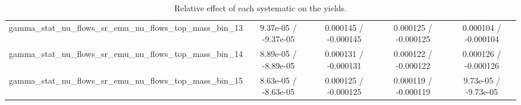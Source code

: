\documentclass[10pt]{article}
\begin{document}
\begin{table}[htbp]
\begin{center}
\begin{tabular}{|c|c|c|c|c|}
  gamma_stat_nu_flows_sr_emu_nu_flows_top_mass_bin_13 & 9.37e-05 / -9.37e-05 & 0.000145 / -0.000145 & 0.000125 / -0.000125 & 0.000104 / -0.000104 \\ 
  gamma_stat_nu_flows_sr_emu_nu_flows_top_mass_bin_14 & 8.89e-05 / -8.89e-05 & 0.000131 / -0.000131 & 0.000122 / -0.000122 & 0.000126 / -0.000126 \\ 
  gamma_stat_nu_flows_sr_emu_nu_flows_top_mass_bin_15 & 8.63e-05 / -8.63e-05 & 0.000125 / -0.000125 & 0.000119 / -0.000119 & 9.73e-05 / -9.73e-05 \\ 
\hline 
\end{tabular} 
\caption{Relative effect of each systematic on the yields.} 
\end{center} 
\end{table} 
\end{document}
